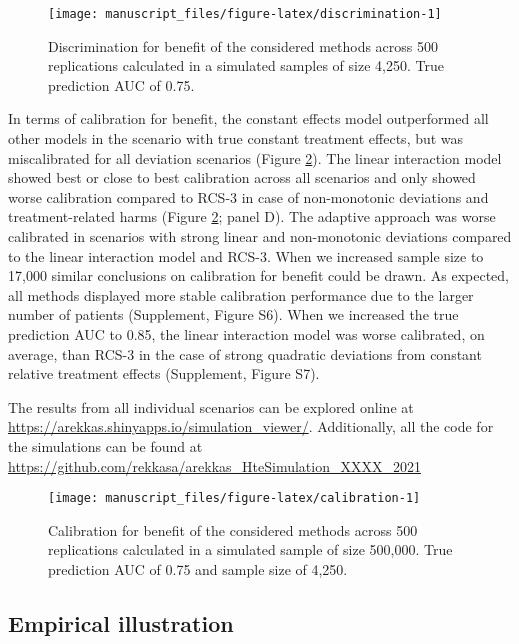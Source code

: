 \documentclass[]{elsarticle} %
\begin{document}
\begin{figure}
\texttt{[image: manuscript\_files/figure-latex/discrimination-1]} \caption{Discrimination for benefit of the considered methods across 500 replications calculated in a simulated samples of size 4,250. True prediction AUC of 0.75.}\label{fig:discrimination}
\end{figure}

In terms of calibration for benefit, the constant effects model
outperformed all other models in the scenario with true constant
treatment effects, but was miscalibrated for all deviation scenarios
(Figure \ref{fig:calibration}). The linear interaction model showed best
or close to best calibration across all scenarios and only showed worse
calibration compared to RCS-3 in case of non-monotonic deviations and
treatment-related harms (Figure \ref{fig:calibration}; panel D). The
adaptive approach was worse calibrated in scenarios with strong linear
and non-monotonic deviations compared to the linear interaction model
and RCS-3. When we increased sample size to 17,000 similar conclusions
on calibration for benefit could be drawn. As expected, all methods
displayed more stable calibration performance due to the larger number
of patients (Supplement, Figure S6). When we increased the true
prediction AUC to 0.85, the linear interaction model was worse
calibrated, on average, than RCS-3 in the case of strong quadratic
deviations from constant relative treatment effects (Supplement, Figure
S7).

The results from all individual scenarios can be explored online at
\url{https://arekkas.shinyapps.io/simulation_viewer/}. Additionally, all
the code for the simulations can be found at
\url{https://github.com/rekkasa/arekkas_HteSimulation_XXXX_2021}

\begin{figure}
\texttt{[image: manuscript\_files/figure-latex/calibration-1]} \caption{Calibration for benefit of the considered methods across 500 replications calculated in a simulated sample of size 500,000. True prediction AUC of 0.75 and sample size of 4,250.}\label{fig:calibration}
\end{figure}

\hypertarget{empirical-illustration}{%
\subsection{Empirical illustration}\label{empirical-illustration}}
\end{document}
